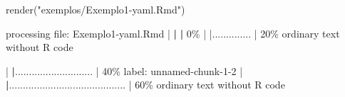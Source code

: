 \documentclass[
  10pt,
  a4paper]{book}
\newenvironment{Shaded}{\begin{snugshade}}{\end{snugshade}}
\newcommand{\DecValTok}[1]{\textcolor[rgb]{0.00,0.00,0.81}{#1}}
\newcommand{\ErrorTok}[1]{\textcolor[rgb]{0.64,0.00,0.00}{\textbf{#1}}}
\newcommand{\FunctionTok}[1]{\textcolor[rgb]{0.00,0.00,0.00}{#1}}
\newcommand{\NormalTok}[1]{#1}
\newcommand{\SpecialCharTok}[1]{\textcolor[rgb]{0.00,0.00,0.00}{#1}}
\newcommand{\StringTok}[1]{\textcolor[rgb]{0.31,0.60,0.02}{#1}}
\begin{document}
\begin{Shaded}
\begin{Highlighting}[]
\FunctionTok{render}\NormalTok{(}\StringTok{"exemplos/Exemplo1{-}yaml.Rmd"}\NormalTok{)}


\NormalTok{processing file}\SpecialCharTok{:}\NormalTok{ Exemplo1}\SpecialCharTok{{-}}\NormalTok{yaml.Rmd}
  \SpecialCharTok{|}                                                                              \ErrorTok{|}                                                                      \ErrorTok{|}   \DecValTok{0}\SpecialCharTok{\%  |                                                                              |..............                                                        |  20\%}
\NormalTok{  ordinary text without R code}

  \SpecialCharTok{|}                                                                              \ErrorTok{|}\NormalTok{............................                                          }\SpecialCharTok{|}  \DecValTok{40}\NormalTok{\%}
\NormalTok{label}\SpecialCharTok{:}\NormalTok{ unnamed}\SpecialCharTok{{-}}\NormalTok{chunk}\DecValTok{{-}1{-}2}
  \SpecialCharTok{|}                                                                              \ErrorTok{|}\NormalTok{..........................................                            }\SpecialCharTok{|}  \DecValTok{60}\NormalTok{\%}
\NormalTok{  ordinary text without R code}


\end{Highlighting}
\end{Shaded}
\end{document}
